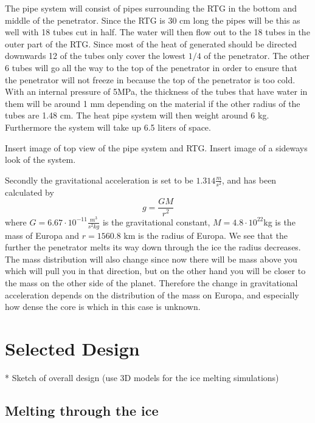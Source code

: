 \noindent
The pipe system will consist of pipes surrounding the RTG in the bottom and middle of the penetrator. Since the RTG is 30 cm long the pipes will be this as well with 18 tubes cut in half. The water will then flow out to the 18 tubes in the outer part of the RTG. Since most of the heat of generated should be directed downwards 12 of the tubes only cover the lowest $1/4$ of the penetrator. The other 6 tubes will go all the way to the top of the penetrator in order to ensure that the penetrator will not freeze in because the top of the penetrator is too cold. With an internal pressure of 5MPa, the thickness of the tubes that have water in them will be around 1 mm depending on the material if the other radius of the tubes are 1.48 cm. The heat pipe system will then weight around 6 kg. Furthermore the system will take up 6.5 liters of space. 

Insert image of top view of the pipe system and RTG. 
Insert image of a sideways look of the system.


Secondly the gravitational acceleration is set to be $1.314 \frac{m}{s^2}$, and has been calculated by 
\begin{equation}
g = \frac{GM}{r^2}
\end{equation} 
where $G = 6.67\cdot 10^{-11}\frac{m^3}{s^2 kg}$ is the gravitational constant, $M = 4.8\cdot 10^{22}$kg is the mass of Europa and $r = 1560.8$ km is the radius of Europa.  We see that the further the penetrator melts its way down through the ice the radius decreases. The mass distribution will also change since now there will be mass above you which will pull you in that direction, but on the other hand you will be closer to the mass on the other side of the planet. Therefore the change in gravitational acceleration depends on the distribution of the mass on Europa, and especially how dense the core is which in this case is unknown. 



\section{Selected Design}

* Sketch of overall design (use 3D models for the ice melting simulations)

\subsection{Melting through the ice} %


